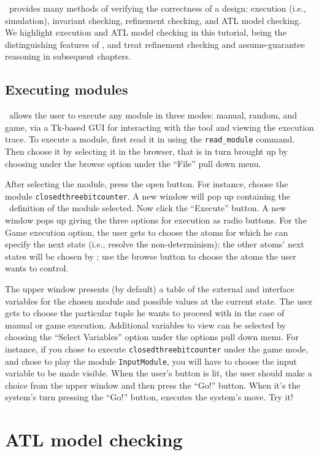 \mocha\ provides many methods of verifying the correctness of a design:
execution (i.e., simulation), invariant checking, refinement checking,
and ATL model checking. We highlight execution and ATL model checking
in this tutorial, being the distinguishing features of \mocha, and
treat refinement checking and assume-guarantee reasoning in subsequent
chapters. 

\subsection{Executing modules}
\mocha\ allows the user to execute any module in three modes: manual,
random, and game, via a Tk-based GUI for interacting with the tool and
viewing the execution trace. To execute a module, first read it in
using the {\tt read\_module} command. Then choose it by selecting it in the
browser, that is in turn brought up by choosing under the browse
option under the ``File'' pull down menu. 

After selecting the module, press the open button. For instance,
choose the module {\tt closedthreebitcounter}. A new window will pop
up containing the\\ \rem\ definition of the module selected. Now click
the ``Execute'' button. A new window pops up giving the three options
for execution as radio buttons. For the Game execution option, the
user gets to choose the atoms for which he can specify the next state
(i.e., resolve the non-determinism); the other atoms' next states will
be chosen by \mocha; use the browse button to choose the atoms the
user wants to control. 

The upper window presents (by default) a table of the external and interface
variables for the chosen module and possible values at the current
state. The user gets to choose the particular tuple he wants to
proceed with in the case of manual or game execution.  Additional
variables to view can be selected by choosing the ``Select Variables''
option under the options pull down menu. For instance, if you chose to
execute {\tt closedthreebitcounter} under the game mode, and chose to
play the module {\tt InputModule}, you will have to choose the
input variable to be made visible. When the user's button is lit, the
user should make a choice from the upper window and then press the
``Go!'' button. When it's the system's turn pressing the ``Go!''
button, executes the system's move. Try it!

\section{ATL model checking}

